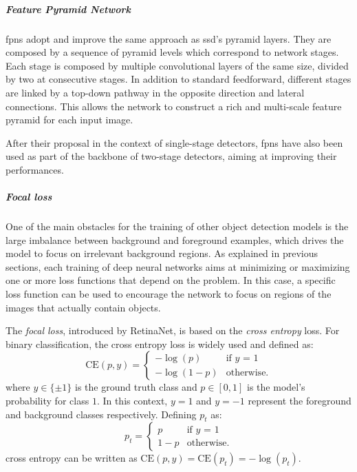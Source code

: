 \documentclass[%
    corpo=12pt,
    twoside,
    stile=classica,   
    tipotesi=magistrale,
    evenboxes,
    english,
	numerazioneromana,
]{toptesi}
\begin{document}
\subparagraph{Feature Pyramid Network}
\glspl{fpn}\cite{lin2017feature} adopt and improve the same approach as \acrshort{ssd}'s pyramid layers. They are composed by a sequence of pyramid levels which correspond to network stages. Each stage is composed by multiple convolutional layers of the same size, divided by two at consecutive stages. In addition to standard feedforward, different stages are linked by a top-down pathway in the opposite direction and lateral connections. This allows the network to construct a rich and multi-scale feature pyramid for each input image.

After their proposal in the context of single-stage detectors, \glspl{fpn} have also been used as part of the backbone of two-stage detectors, aiming at improving their performances.

\subparagraph{Focal loss}
One of the main obstacles for the training of other object detection models is the large imbalance between background and foreground examples, which drives the model to focus on irrelevant background regions.
As explained in previous sections, each training of deep neural networks aims at minimizing or maximizing one or more loss functions that depend on the problem.
In this case, a specific loss function can be used to encourage the network to focus on regions of the images that actually contain objects.

\bigskip
The \textit{focal loss}, introduced by RetinaNet, is based on the \textit{cross entropy} loss. For binary classification, the cross entropy loss is widely used and defined as:
\begin{equation}
	\text{CE}(p,y) = \begin{cases}
		-\log(p) & \text{if $y$ = 1}\\
		-\log(1-p) & \text{otherwise.}
	\end{cases}
\end{equation}
where $y\in \{\pm 1\}$ is the ground truth class and $p\in\left[0,1\right]$ is the model's probability for class $1$. In this context, $y=1$ and $y=-1$ represent the foreground and background classes respectively. Defining $p_t$ as:
\begin{equation}
	p_t = \begin{cases}
		p & \text{if $y$ = 1}\\
		1-p & \text{otherwise.}
	\end{cases}
\end{equation}
cross entropy can be written as $\text{CE}(p,y) = \text{CE}(p_t) = -\log(p_t)$.
\end{document}
